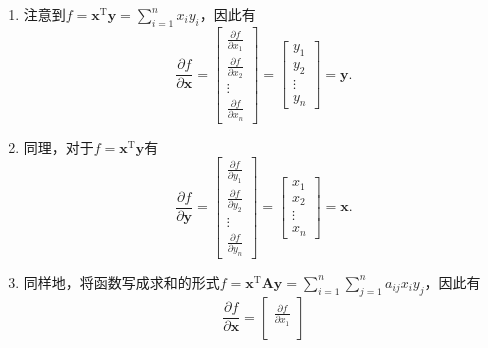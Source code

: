\begin{solution}
    \begin{enumerate}
        \item 注意到\( f = \bm{x}^{\mathrm{T}} \bm{y}  = \sum_{i=1}^{n} x_i y_i\)，因此有
              \[
                  \frac{\partial f}{\partial \bm{x}} = \begin{bmatrix}
                      \frac{\partial f}{\partial x_1} \\
                      \frac{\partial f}{\partial x_2} \\
                      \vdots                          \\
                      \frac{\partial f}{\partial x_n}
                  \end{bmatrix} = \begin{bmatrix}
                      y_1    \\
                      y_2    \\
                      \vdots \\
                      y_n
                  \end{bmatrix} = \bm{y}.
              \]
        \item 同理，对于\( f = \bm{x}^{\mathrm{T}} \bm{y}  \)有
              \[
                  \frac{\partial f}{\partial \bm{y}} = \begin{bmatrix}
                      \frac{\partial f}{\partial y_1} \\
                      \frac{\partial f}{\partial y_2} \\
                      \vdots                          \\
                      \frac{\partial f}{\partial y_n}
                  \end{bmatrix} = \begin{bmatrix}
                      x_1    \\
                      x_2    \\
                      \vdots \\
                      x_n
                  \end{bmatrix} = \bm{x}.
              \]
        \item 同样地，将函数写成求和的形式\( f = \bm{x}^{\mathrm{T}} \mathbf{A} \bm{y} = \sum_{i=1}^{n} \sum_{j=1}^{n} a_{ij} x_i  y_j \)，因此有
              \[
                  \frac{\partial f}{\partial \bm{x}} = \begin{bmatrix}
                      \frac{\partial f}{\partial x_1} \\

\end{bmatrix}\]
\end{enumerate}
\end{solution}
